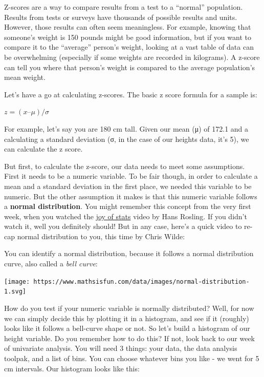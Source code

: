 \documentclass[
]{book}
\begin{document}
Z-scores are a way to compare results from a test to a ``normal'' population. Results from tests or surveys have thousands of possible results and units. However, those results can often seem meaningless. For example, knowing that someone's weight is 150 pounds might be good information, but if you want to compare it to the ``average'' person's weight, looking at a vast table of data can be overwhelming (especially if some weights are recorded in kilograms). A z-score can tell you where that person's weight is compared to the average population's mean weight.

Let's have a go at calculating z-scores. The basic z score formula for a sample is:

\(z = (x – μ) / σ\)

For example, let's say you are 180 cm tall. Given our mean (μ) of 172.1 and a calculating a standard deviation (σ, in the case of our heights data, it's 5), we can calculate the z score.

But first, to calculate the z-score, our data needs to meet some assumptions. First it needs to be a numeric variable. To be fair though, in order to calculate a mean and a standard deviation in the first place, we needed this variable to be numeric. But the other assumption it makes is that this numeric variable follows a \textbf{normal distribution}. You might remember this concept from the very first week, when you watched the \href{http://www.gapminder.org/videos/the-joy-of-stats/}{joy of stats} video by Hans Rosling. If you didn't watch it, well you definitely should! But in any case, here's a quick video to re-cap normal distribution to you, this time by Chris Wilde:

You can identify a normal distribution, because it follows a normal distribution curve, also called a \emph{bell curve}:

\texttt{[image: https://www.mathsisfun.com/data/images/normal-distribution-1.svg]}

How do you test if your numeric variable is normally distributed? Well, for now we can simply decide this by plotting it in a histogram, and see if it (roughly) looks like it follows a bell-curve shape or not. So let's build a histogram of our height variable. Do you remember how to do this? If not, look back to our week of univariate analysis. You will need 3 things: your data, the data analysis toolpak, and a list of bins. You can choose whatever bins you like - we went for 5 cm intervals. Our histogram looks like this:
\end{document}
